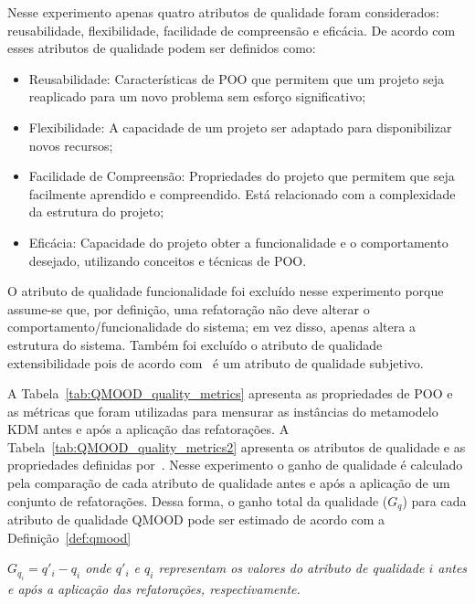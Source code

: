 Nesse experimento apenas quatro atributos de qualidade foram considerados: reusabilidade, flexibilidade, facilidade de compreensão e eficácia. De acordo com~ esses atributos de qualidade podem ser definidos como: 

\begin{itemize}
\item Reusabilidade: Características de POO que permitem que um projeto seja reaplicado para um novo problema sem esforço significativo;
\item Flexibilidade: A capacidade de um projeto ser adaptado para disponibilizar novos recursos;
\item Facilidade de Compreensão: Propriedades do projeto que permitem que seja facilmente aprendido e compreendido. Está relacionado com a complexidade da estrutura do projeto;
\item Eficácia: Capacidade do projeto obter a funcionalidade e o comportamento desejado, utilizando conceitos e técnicas de POO.
\end{itemize}

O atributo de qualidade funcionalidade foi excluído nesse experimento porque assume-se que, por definição, uma refatoração não deve alterar o comportamento/funcionalidade do sistema; em vez disso, apenas altera a estrutura do sistema. Também foi excluído o atributo de qualidade extensibilidade pois de acordo com~ é um atributo de qualidade subjetivo. 

A Tabela~\ref{tab:QMOOD_quality_metrics} apresenta as propriedades de POO e as métricas que foram utilizadas para mensurar as instâncias do metamodelo KDM antes e após a aplicação das refatorações. A Tabela~\ref{tab:QMOOD_quality_metrics2} apresenta os atributos de qualidade e as propriedades definidas por~. Nesse experimento o ganho de qualidade é calculado pela comparação de cada atributo de qualidade antes e após a aplicação de um conjunto de refatorações. Dessa forma, o ganho total da qualidade ($G_{q}$) para cada atributo de qualidade QMOOD pode ser estimado de acordo com a Definição~\ref{def:qmood}

\begin{definicao}\label{def:qmood}
    \textit{$G_{q_{i}} = q'_{i} - q_{i}$ onde $q'_{i}$ e $q_{i}$ representam os valores do atributo de qualidade $i$ antes e após a aplicação das refatorações, respectivamente.}
\end{definicao}

